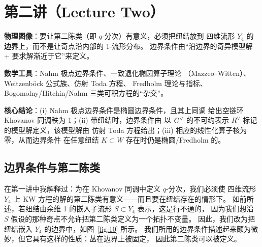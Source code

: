 
\section{第二讲（Lecture Two）}
\label{sec:lecture-two}

\begin{keypoints}
  \item \textbf{物理图像}：要让第二陈类（即 $q$-分次）有意义，必须把纽结放到
        四维流形 $Y_4$ 的\textbf{边界}上，而不是让奇点沿内部的 1-流形分布。
        边界条件由“沿边界的奇异模型解 + 要求解渐近于它”来定义。
  \item \textbf{数学工具}：Nahm 极点边界条件、一致退化椭圆算子理论
        （Mazzeo–Witten）、Weitzenböck 公式族、仿射 Toda 方程、
        Fredholm 理论与指标、Bogomolny/Hitchin/Nahm 三类可积方程的“杂交”。
  \item \textbf{核心结论}：(i) Nahm 极点边界条件是椭圆边界条件，且其上同调
        给出空链环 Khovanov 同调秩为 1；(ii) 带纽结时，边界条件由
        以 $G^{\vee}$ 的不可约表示 $R^{\vee}$ 标记的模型解定义，该模型解由
        仿射 Toda 方程给出；(iii) 相应的线性化算子核为零，从而边界条件
        在任意纽结 $K\subset W$ 存在时仍是椭圆/Fredholm 的。
\end{keypoints}

\subsection{边界条件与第二陈类}

在第一讲中我解释过：为在 Khovanov 同调中定义 $q$-分次，我们必须使
四维流形 $Y_4$ 上 KW 方程的解的第二陈类有意义——而且要在纽结存在的情形下。
如前所述，若纽结由余维 1 的嵌入子流形 $S\subset Y_4$ 表示，这是行不通的，
因为我们想沿 $S$ 假设的那种奇点不允许把第二陈类定义为一个拓扑不变量。
因此，我们改为把纽结嵌入 $Y_4$ 的边界中，如图~\ref{fig:10} 所示。
我们所用的边界条件描述起来颇为微妙，但它具有这样的性质：丛在边界上被固定，
因此第二陈类可以被定义。


